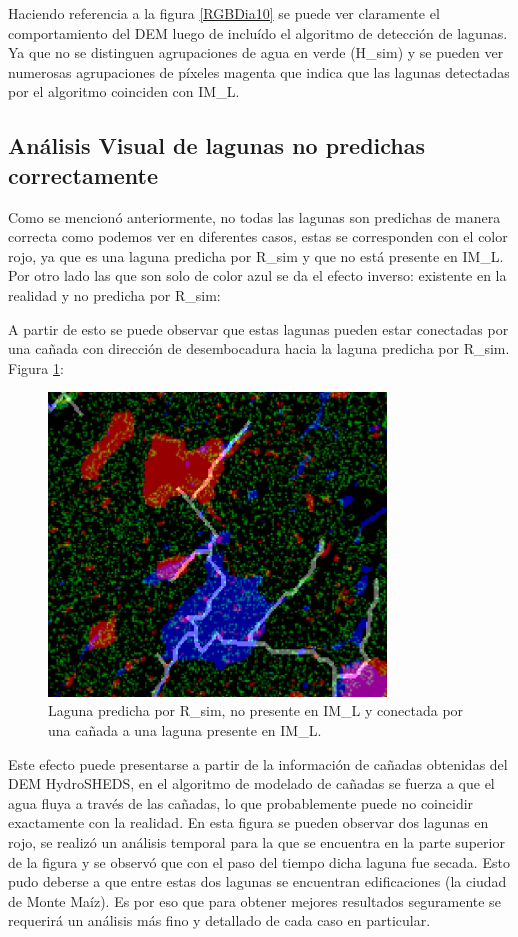 \documentclass[10pt,a4paper, twoside]{report}
\begin{document}
Haciendo referencia a la figura \ref{RGBDia10} se puede ver claramente el comportamiento del DEM luego de incluído el algoritmo de detección de lagunas. Ya que no se distinguen agrupaciones de agua en verde (H\_sim) y se pueden ver numerosas agrupaciones de píxeles magenta que indica que las lagunas detectadas por el algoritmo coinciden con IM\_L.

\subsection{Análisis Visual de lagunas no predichas correctamente}
\label{obscorreccionlagunas}
Como se mencionó anteriormente, no todas las lagunas son predichas de manera correcta como podemos ver en diferentes casos, estas se corresponden con el color rojo, ya que es una laguna predicha por R\_sim y que no está presente en IM\_L. Por otro lado las que son solo de color azul se da el efecto inverso: existente en la realidad y no predicha por R\_sim:

A partir de esto se puede observar que estas lagunas pueden estar conectadas por una cañada con dirección de desembocadura hacia la laguna predicha por R\_sim. Figura \ref{LagunaProblema1}: 

\begin{figure}[!htb]
   \centering      
   \includegraphics[width=0.8\textwidth]{imagenes/LagunaProblema1.jpg}
 \caption{Laguna predicha por R\_sim, no presente en IM\_L y conectada por una cañada a una laguna presente en IM\_L.}
 \label{LagunaProblema1}
\end{figure}

Este efecto puede presentarse a partir de la información de cañadas obtenidas del DEM HydroSHEDS, en el algoritmo de modelado de cañadas se fuerza a que el agua fluya a través de las cañadas, lo que probablemente puede no coincidir exactamente con la realidad. En esta figura se pueden observar dos lagunas en rojo, se realizó un análisis temporal para la que se encuentra en la parte superior de la figura y se observó que con el paso del tiempo dicha laguna fue secada. Esto pudo deberse a que entre estas dos lagunas se encuentran edificaciones (la ciudad de Monte Maíz). Es por eso que para obtener mejores resultados seguramente se requerirá un análisis más fino y detallado de cada caso en particular.
\end{document}
